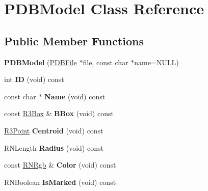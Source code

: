 \hypertarget{class_p_d_b_model}{}\section{P\+D\+B\+Model Class Reference}
\label{class_p_d_b_model}
\subsection*{Public Member Functions}
\begin{DoxyCompactItemize}
\item 
{\bfseries P\+D\+B\+Model} (\hyperlink{class_p_d_b_file}{P\+D\+B\+File} $\ast$file, const char $\ast$name=N\+U\+LL)\hypertarget{class_p_d_b_model_a5fb53ed3a92412cec7fdb431eec99fae}{}\label{class_p_d_b_model_a5fb53ed3a92412cec7fdb431eec99fae}

\item 
int {\bfseries ID} (void) const \hypertarget{class_p_d_b_model_aef3f79f1767c85d77283c81b650e1897}{}\label{class_p_d_b_model_aef3f79f1767c85d77283c81b650e1897}

\item 
const char $\ast$ {\bfseries Name} (void) const \hypertarget{class_p_d_b_model_a6e61c8df27d5872d7ae8ee73e278ee2b}{}\label{class_p_d_b_model_a6e61c8df27d5872d7ae8ee73e278ee2b}

\item 
const \hyperlink{class_r3_box}{R3\+Box} \& {\bfseries B\+Box} (void) const \hypertarget{class_p_d_b_model_ab0c4da918295d00014b543bd9dd4f7c1}{}\label{class_p_d_b_model_ab0c4da918295d00014b543bd9dd4f7c1}

\item 
\hyperlink{class_r3_point}{R3\+Point} {\bfseries Centroid} (void) const \hypertarget{class_p_d_b_model_abcf3055ce4fb6d7079b55fd8f9c54574}{}\label{class_p_d_b_model_abcf3055ce4fb6d7079b55fd8f9c54574}

\item 
R\+N\+Length {\bfseries Radius} (void) const \hypertarget{class_p_d_b_model_abea4eda100b71c8f00d5591f8f95d2b3}{}\label{class_p_d_b_model_abea4eda100b71c8f00d5591f8f95d2b3}

\item 
const \hyperlink{class_r_n_rgb}{R\+N\+Rgb} \& {\bfseries Color} (void) const \hypertarget{class_p_d_b_model_a453427eb96e05c6429aa2aea67fe3601}{}\label{class_p_d_b_model_a453427eb96e05c6429aa2aea67fe3601}

\item 
R\+N\+Boolean {\bfseries Is\+Marked} (void) const \hypertarget{class_p_d_b_model_a34a0386b1a6e137825aadcea29e1f8be}{}\label{class_p_d_b_model_a34a0386b1a6e137825aadcea29e1f8be}


\end{DoxyCompactItemize}
